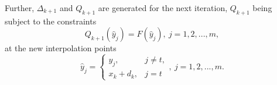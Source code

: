 Further, $\Delta_{k+1}$ and $Q_{k+1}$ are generated for the next iteration, $Q_{k+1}$ being subject to the constraints 
\begin{equation}
	Q_{k+1}(\hat{y}_j)= F(\hat{y}_j), \  j = 1, 2, ..., m, 
\end{equation}
at the new interpolation points
\begin{equation}
	\hat{y}_j =
	\begin{cases}
		y_j, & j \neq t, \\
		x_k+d_k  , & j =t 
	\end{cases},  \  j = 1, 2, ..., m.
\end{equation}



 














